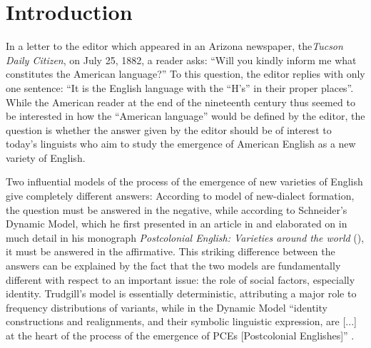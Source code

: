 \hypertarget{Toc63021202}{}\chapter{Introduction}
\hypertarget{Toc63021203}{}
In a letter to the editor which appeared in an Arizona newspaper, the\emph{Tucson Daily Citizen}, on July 25, 1882, a reader asks: “Will you kindly inform me what constitutes the American language?” To this question, the editor replies with only one sentence: “It is the English language with the “H’s” in their proper places”. While the American reader at the end of the nineteenth century thus seemed to be interested in how the “American language” would be defined by the editor, the question is whether the answer given by the editor should be of interest to today’s linguists who aim to study the emergence of American English as a new variety of English.


Two influential models of the process of the emergence of new varieties of English give completely different answers: According to  model of new-dialect formation, the question must be answered in the negative, while according to Schneider’s Dynamic Model, which he first presented in an article in \citeyear{Schneider2003} and elaborated on in much detail in his monograph \emph{Postcolonial English: Varieties around the world} (\citeyear{Schneider2007}), it must be answered in the affirmative. This striking difference between the answers can be explained by the fact that the two models are fundamentally different with respect to an important issue: the role of social factors, especially identity. Trudgill’s model is essentially deterministic, attributing a major role to frequency distributions of variants, while in the Dynamic Model “identity constructions and realignments, and their symbolic linguistic expression, are [...] at the heart of the process of the emergence of PCEs [Postcolonial Englishes]” \citep[28]{Schneider2007}.

